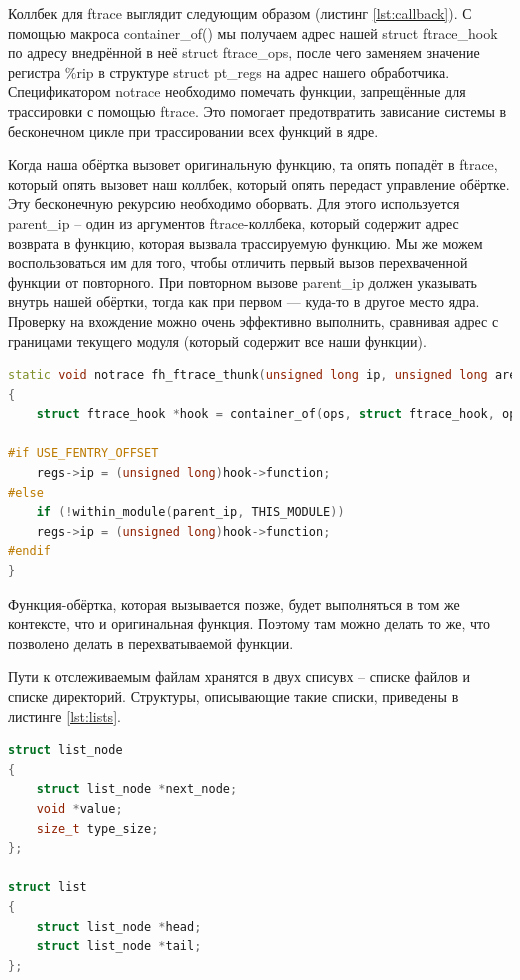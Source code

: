 \documentclass[a4paper,14pt]{article}
\begin{document}
Коллбек для ftrace выглядит следующим образом (листинг \ref{lst:callback}). С помощью макроса container\_of() мы получаем адрес нашей struct ftrace\_hook по адресу внедрённой в неё struct ftrace\_ops, после чего заменяем значение регистра \%rip в структуре struct pt\_regs на адрес нашего обработчика. Спецификатором notrace необходимо помечать функции, запрещённые для трассировки с помощью ftrace. Это помогает предотвратить зависание системы в бесконечном цикле при трассировании всех функций в ядре.

Когда наша обёртка вызовет оригинальную функцию, та опять попадёт в ftrace, который опять вызовет наш коллбек, который опять передаст управление обёртке. Эту бесконечную рекурсию необходимо оборвать. Для этого используется parent\_ip -- один из аргументов ftrace-коллбека, который содержит адрес возврата в функцию, которая вызвала трассируемую функцию. Мы же можем воспользоваться им для того, чтобы отличить первый вызов перехваченной функции от повторного. При повторном вызове parent\_ip должен указывать внутрь нашей обёртки, тогда как при первом — куда-то в другое место ядра. Проверку на вхождение можно очень эффективно выполнить, сравнивая адрес с границами текущего модуля (который содержит все наши функции). 

\begin{lstlisting}[language=C++,label={lst:callback}, caption=\text{Обратный вызов для ftrace.}]
static void notrace fh_ftrace_thunk(unsigned long ip, unsigned long arent_ip, struct ftrace_ops *ops, struct pt_regs *regs)
{
	struct ftrace_hook *hook = container_of(ops, struct ftrace_hook, ops);

#if USE_FENTRY_OFFSET
	regs->ip = (unsigned long)hook->function;
#else
	if (!within_module(parent_ip, THIS_MODULE))
	regs->ip = (unsigned long)hook->function;
#endif
}
\end{lstlisting}

Функция-обёртка, которая вызывается позже, будет выполняться в том же контексте, что и оригинальная функция. Поэтому там можно делать то же, что позволено делать в перехватываемой функции.

Пути к отслеживаемым файлам хранятся в двух списувх -- списке файлов и списке директорий. Структуры, описывающие такие списки, приведены в листинге \ref{lst:lists}.


\begin{lstlisting}[language=C++,label={lst:lists}, caption=\text{Реализация списка.}]
struct list_node
{
	struct list_node *next_node;
	void *value;
	size_t type_size;
};

struct list
{
	struct list_node *head;
	struct list_node *tail;
};
\end{lstlisting}
\end{document}
